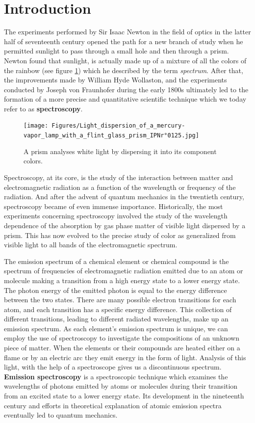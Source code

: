 \documentclass[%
 reprint,
 amsmath,amssymb,
 aps,
]{revtex4-2}
\begin{document}
\section{\label{sec:level1}Introduction}
    The experiments performed by Sir Isaac Newton in the field of optics in the latter half of seventeenth century opened the path for a new branch of study when he permitted sunlight to pass through a small hole and then through a prism. Newton found that sunlight, is actually made up of a mixture of all the colors of the rainbow (see figure \ref{fig:prism}) which he described by the term \textit{spectrum}. After that, the improvements made by William Hyde Wollaston, and the experiments conducted by Joseph von Fraunhofer during the early 1800s ultimately led to the formation of a more precise and quantitative scientific technique which we today refer to as \textbf{spectroscopy}.
    \begin{figure}
        \centering
        \texttt{[image: Figures/Light\_dispersion\_of\_a\_mercury-vapor\_lamp\_with\_a\_flint\_glass\_prism\_IPNr°0125.jpg]}
        \caption{A prism analyses white light by dispersing it into its component colors.}
        \label{fig:prism}
    \end{figure}
    \par
    Spectroscopy, at its core, is the study of the interaction between matter and electromagnetic radiation as a function of the wavelength or frequency of the radiation. And after the advent of quantum mechanics in the twentieth century, spectroscopy became of even immense importance. Historically, the most experiments concerning spectroscopy involved the study of the wavelength dependence of the absorption by gas phase matter of visible light dispersed by a prism. This has now evolved to the precise study of color as generalized from visible light to all bands of the electromagnetic spectrum.
    \par
    The emission spectrum of a chemical element or chemical compound is the spectrum of frequencies of electromagnetic radiation emitted due to an atom or molecule making a transition from a high energy state to a lower energy state. The photon energy of the emitted photon is equal to the energy difference between the two states. There are many possible electron transitions for each atom, and each transition has a specific energy difference. This collection of different transitions, leading to different radiated wavelengths, make up an emission spectrum. As each element's emission spectrum is unique, we can employ the use of spectroscopy to investigate the compositions of an unknown piece of matter. When the elements or their compounds are heated either on a flame or by an electric arc they emit energy in the form of light. Analysis of this light, with the help of a spectroscope gives us a discontinuous spectrum. \textbf{Emission spectroscopy} is a spectroscopic technique which examines the wavelengths of photons emitted by atoms or molecules during their transition from an excited state to a lower energy state. Its development in the nineteenth century and efforts in theoretical explanation of atomic emission spectra eventually led to quantum mechanics.
\end{document}
